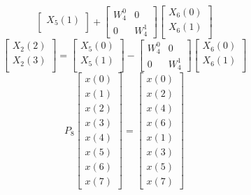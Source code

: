 \documentclass[journal,12pt,twocolumn]{IEEEtran}
\renewcommand\thesection{\arabic{section}}
\begin{document}
\begin{enumerate}[label=\thesection.\arabic*]
\begin{enumerate}[label=\arabic*.,ref=\thesection.\theenumi]
\begin{equation}
\begin{bmatrix}
			X_{5}(1)\\ 
		\end{bmatrix}
		+
		\begin{bmatrix}
			W^{0}_{4} & 0\\
			0 & W^{1}_{4}
		\end{bmatrix}
		\begin{bmatrix}
			X_{6}(0) \\ 
			X_{6}(1) \\ 
		\end{bmatrix}
	\end{equation}
	\begin{equation}
		\begin{bmatrix}
			X_{2}(2) \\ 
			X_{2}(3)\\ 
		\end{bmatrix}
		=
		\begin{bmatrix}
			X_{5}(0) \\ 
			X_{5}(1)\\ 
		\end{bmatrix}
		-
		\begin{bmatrix}
			W^{0}_{4} & 0\\
			0 & W^{1}_{4}
		\end{bmatrix}
		\begin{bmatrix}
			X_{6}(0) \\ 
			X_{6}(1) \\ 
		\end{bmatrix}
	\end{equation}
	\begin{equation}
		P_{8}
		\begin{bmatrix}
			x(0) \\ 
			x(1) \\ 
			x(2) \\ 
			x(3) \\ 
			x(4) \\ 
			x(5) \\
			x(6) \\
			x(7)
		\end{bmatrix}
		= 
		\begin{bmatrix}
			x(0) \\ 
			x(2) \\ 
			x(4) \\ 
			x(6) \\
			x(1) \\ 
			x(3) \\ 
			x(5) \\
			x(7)
		\end{bmatrix}

\end{equation}
\end{enumerate}
\end{enumerate}
\end{document}

